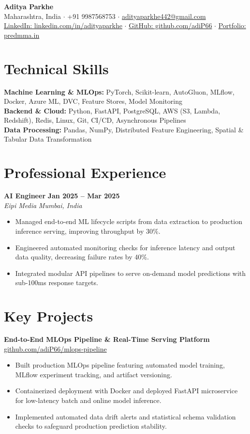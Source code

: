 \documentclass[10pt,a4paper]{article}
\begin{document}
\begin{center}
    {\LARGE \textbf{Aditya Parkhe}} \\[3pt]
    \small Maharashtra, India \; $\cdot$ \; +91 9987568753 \; $\cdot$ \; \href{mailto:adityaparkhe442@gmail.com}{adityaparkhe442@gmail.com} \\[2pt]
    \href{https://linkedin.com/in/adityaparkhe}{LinkedIn: linkedin.com/in/adityaparkhe} \; $\cdot$ \; \href{https://github.com/adiP66}{GitHub: github.com/adiP66} \; $\cdot$ \; \href{https://predmma.in}{Portfolio: predmma.in}
\end{center}

\section*{Technical Skills}
\textbf{Machine Learning \& MLOps:} PyTorch, Scikit-learn, AutoGluon, MLflow, Docker, Azure ML, DVC, Feature Stores, Model Monitoring \\
\textbf{Backend \& Cloud:} Python, FastAPI, PostgreSQL, AWS (S3, Lambda, Redshift), Redis, Linux, Git, CI/CD, Asynchronous Pipelines \\
\textbf{Data Processing:} Pandas, NumPy, Distributed Feature Engineering, Spatial \& Tabular Data Transformation

\section*{Professional Experience}
\textbf{AI Engineer} \hfill \textbf{Jan 2025 -- Mar 2025} \\
\textit{Eipi Media} \hfill \textit{Mumbai, India}
\begin{itemize}
    \item Managed end-to-end ML lifecycle scripts from data extraction to production inference serving, improving throughput by 30\%.
    \item Engineered automated monitoring checks for inference latency and output data quality, decreasing failure rates by 40\%.
    \item Integrated modular API pipelines to serve on-demand model predictions with sub-100ms response targets.
\end{itemize}

\section*{Key Projects}
\textbf{End-to-End MLOps Pipeline \& Real-Time Serving Platform} \hfill \href{https://github.com/adiP66}{github.com/adiP66/mlops-pipeline}
\begin{itemize}
    \item Built production MLOps pipeline featuring automated model training, MLflow experiment tracking, and artifact versioning.
    \item Containerized deployment with Docker and deployed FastAPI microservice for low-latency batch and online model inference.
    \item Implemented automated data drift alerts and statistical schema validation checks to safeguard production prediction stability.
\end{itemize}
\end{document}
